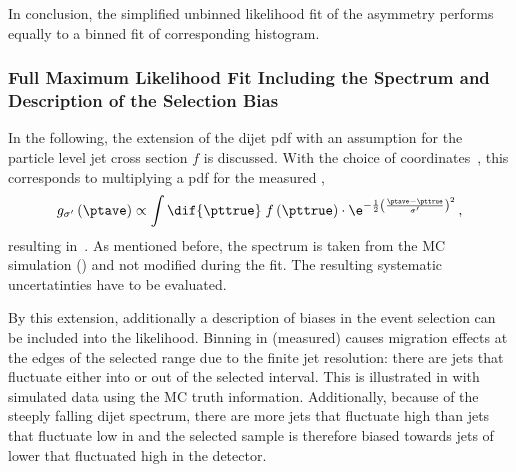 In conclusion, the simplified unbinned likelihood fit of the asymmetry performs equally to a binned fit of corresponding histogram.



\subsubsection{Full Maximum Likelihood Fit Including the Spectrum and Description of the Selection Bias}\label{sec:ResFit:Asym:FullFit}

In the following, the extension of the dijet pdf with an assumption for the particle level jet \pt cross section $f$ is discussed.
With the choice of coordinates~, this corresponds to multiplying a pdf for the measured \ptave,
\begin{equation*}
\label{eq:ResFit::DijetPdfTransformed:Simple}
  g_{\sigma'}\left(\ptave\right) \propto
  \int\dif{\pttrue}\;f\left(\pttrue\right)\cdot
  \e^{-\frac{1}{2}\left(\frac{\ptave - \pttrue}{\sigma'}\right)^{2}} \, , 
\end{equation*}
resulting in~.
As mentioned before, the spectrum is taken from the MC simulation () and not modified during the fit.
The resulting systematic uncertatinties have to be evaluated.

By this extension, additionally a description of biases in the event selection can be included into the likelihood.
Binning in (measured) \ptave causes migration effects at the edges of the selected \ptave range due to the finite jet \pt resolution:
there are jets that fluctuate either into or out of the selected interval.
This is illustrated in  with simulated data using the MC truth information.
Additionally, because of the steeply falling dijet \pt spectrum, there are more jets that fluctuate high than jets that fluctuate low in \pt and the selected sample is therefore biased towards jets of lower \ptgen that fluctuated high in the detector.

